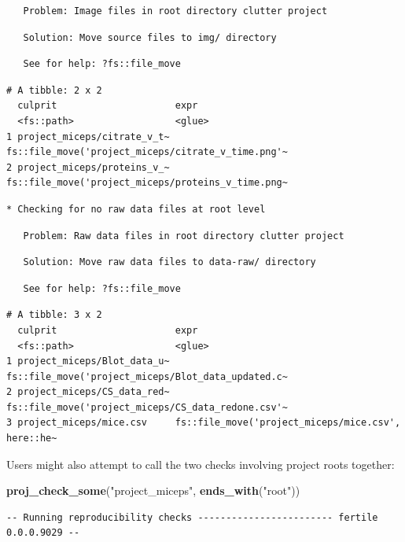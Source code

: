 \documentclass[12pt,twoside]{reedthesis}
\newenvironment{Shaded}{\begin{snugshade}}{\end{snugshade}}
\newcommand{\KeywordTok}[1]{\textcolor[rgb]{0.13,0.29,0.53}{\textbf{#1}}}
\newcommand{\StringTok}[1]{\textcolor[rgb]{0.31,0.60,0.02}{#1}}
\newcommand{\NormalTok}[1]{#1}
\begin{document}
\begin{verbatim}
   Problem: Image files in root directory clutter project
\end{verbatim}
\begin{verbatim}
   Solution: Move source files to img/ directory
\end{verbatim}
\begin{verbatim}
   See for help: ?fs::file_move
\end{verbatim}
\begin{verbatim}
# A tibble: 2 x 2
  culprit                     expr                                              
  <fs::path>                  <glue>                                            
1 project_miceps/citrate_v_t~ fs::file_move('project_miceps/citrate_v_time.png'~
2 project_miceps/proteins_v_~ fs::file_move('project_miceps/proteins_v_time.png~
\end{verbatim}
\begin{verbatim}
* Checking for no raw data files at root level
\end{verbatim}
\begin{verbatim}
   Problem: Raw data files in root directory clutter project
\end{verbatim}
\begin{verbatim}
   Solution: Move raw data files to data-raw/ directory
\end{verbatim}
\begin{verbatim}
   See for help: ?fs::file_move
\end{verbatim}
\begin{verbatim}
# A tibble: 3 x 2
  culprit                     expr                                              
  <fs::path>                  <glue>                                            
1 project_miceps/Blot_data_u~ fs::file_move('project_miceps/Blot_data_updated.c~
2 project_miceps/CS_data_red~ fs::file_move('project_miceps/CS_data_redone.csv'~
3 project_miceps/mice.csv     fs::file_move('project_miceps/mice.csv', here::he~
\end{verbatim}
Users might also attempt to call the two checks involving project roots
together:
\begin{Shaded}
\begin{Highlighting}[]
\KeywordTok{proj_check_some}\NormalTok{(}\StringTok{"project_miceps"}\NormalTok{, }\KeywordTok{ends_with}\NormalTok{(}\StringTok{"root"}\NormalTok{))}
\end{Highlighting}
\end{Shaded}
\begin{verbatim}
-- Running reproducibility checks ------------------------ fertile 0.0.0.9029 --
\end{verbatim}
\end{document}
